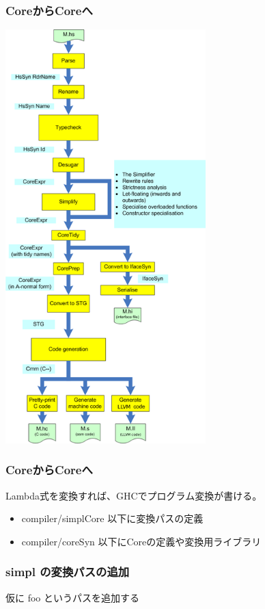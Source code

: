 \documentclass[cjk,dvipdfm,14pt]{beamer}
\begin{document}
\begin{frame}[fragile]
\frametitle{CoreからCoreへ}

\includegraphics[height=16cm]{./hscpipe2.png}

\end{frame}



\begin{frame}[fragile]
\frametitle{CoreからCoreへ}

Lambda式を変換すれば、GHCでプログラム変換が書ける。
\begin{itemize}
\item compiler/simplCore 以下に変換パスの定義
\item compiler/coreSyn 以下にCoreの定義や変換用ライブラリ
\end{itemize}

\end{frame}

\begin{frame}[fragile]
\frametitle{simpl の変換パスの追加}

仮に foo というパスを追加する

\hrulefill

\end{frame}
\end{document}
